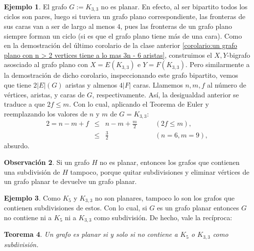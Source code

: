 \documentclass[12pt]{report}
\theoremstyle{plain}
\newtheorem{theorem}{Teorema}[section]
\theoremstyle{definition}
\newtheorem{example}[theorem]{Ejemplo}
\newtheorem{obs}[theorem]{Observación}
\newcommand{\abs}[1]{\left \vert #1 \right \vert}
\begin{document}
\begin{example}
El grafo $G := K_{3,3}$ no es planar. En efecto, al ser bipartito todos los ciclos son pares, luego si tuviera un grafo plano correspondiente, las fronteras de sus caras van a ser de largo al menos $4$, pues las fronteras de un grafo plano siempre forman un ciclo (si es que el grafo plano tiene más de una cara). Como en la demostración del último corolario de la clase anterior \ref{corolario:un grafo plano con n > 2 vertices tiene a lo mas 3n - 6 aristas}, construimos el $X,Y$-bigrafo asosciado al grafo plano con $X = E(K_{3,3})$ e $Y = F(K_{3,3})$. Pero similarmente a la demostración de dicho corolario, inspeccionando este grafo bipartito, vemos que tiene $2 \abs E (G)$ aristas y almenos $4 \abs F$ caras. Llamemos $n,m,f$ al número de vértices, aristas, y caras de $G$, respectivamente. Así, la desigualdad anterior se traduce a que $2 f \leq m$. Con lo cual, aplicando el Teorema de Euler y reemplazando los valores de $n$ y $m$ de $G = K_{3,3}$:
\[
    \begin{array}{lllll}
    2 = n - m + f & \leq & n - m + \frac m 2 & \quad & (2 f \leq m), \\
                    & \leq & \frac 3 2 & \quad & (n = 6, m = 9),
    \end{array}
\]
absurdo.
\end{example}

\begin{obs}
Si un grafo $H$ no es planar, entonces los grafos que contienen una subdivisión de $H$ tampoco, porque quitar subdivisiones y eliminar vértices de un grafo planar te devuelve un grafo planar.
\end{obs}

\begin{example}
Como $K_5$ y $K_{3,3}$ no son planares, tampoco lo son los grafos que contienen subdivisiones de estos. Con lo cual, si $G$ es un grafo planar entonces $G$ no contiene ni a $K_5$ ni a $K_{3,3}$ como subdivisión. De hecho, vale la recíproca:
\end{example}

\begin{theorem}
Un grafo es planar si y solo si no contiene a $K_5$ o $K_{3,3}$ como subdivisión.
\end{theorem}
\end{document}
